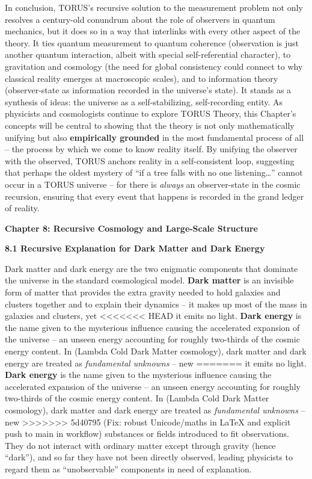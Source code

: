 \documentclass[]{article}
\begin{document}
In conclusion, TORUS's recursive solution to the measurement problem not
only resolves a century-old conundrum about the role of observers in
quantum mechanics, but it does so in a way that interlinks with every
other aspect of the theory. It ties quantum measurement to quantum
coherence (observation is just another quantum interaction, albeit with
special self-referential character), to gravitation and cosmology (the
need for global consistency could connect to why classical reality
emerges at macroscopic scales), and to information theory
(observer-state as information recorded in the universe's state). It
stands as a synthesis of ideas: the universe as a self-stabilizing,
self-recording entity. As physicists and cosmologists continue to
explore TORUS Theory, this Chapter's concepts will be central to showing
that the theory is not only mathematically unifying but also
\textbf{empirically grounded} in the most fundamental process of all --
the process by which we come to know reality itself. By unifying the
observer with the observed, TORUS anchors reality in a self-consistent
loop, suggesting that perhaps the oldest mystery of ``if a tree falls
with no one listening\ldots{}'' cannot occur in a TORUS universe -- for
there is \emph{always} an observer-state in the cosmic recursion,
ensuring that every event that happens is recorded in the grand ledger
of reality.

\textbf{Chapter 8: Recursive Cosmology and Large-Scale Structure}

\textbf{8.1 Recursive Explanation for Dark Matter and Dark Energy}

Dark matter and dark energy are the two enigmatic components that
dominate the universe in the standard cosmological model. \textbf{Dark
matter} is an invisible form of matter that provides the extra gravity
needed to hold galaxies and clusters together and to explain their
dynamics -- it makes up most of the mass in galaxies and clusters, yet
<<<<<<< HEAD
it emits no light\hspace{0pt}. \textbf{Dark energy} is the name given to
the mysterious influence causing the accelerated expansion of the
universe -- an unseen energy accounting for roughly two-thirds of the
cosmic energy content. In \LambdaCDM (Lambda Cold Dark Matter cosmology), dark
matter and dark energy are treated as \emph{fundamental unknowns} -- new
=======
it emits no light​. \textbf{Dark energy} is the name given to the
mysterious influence causing the accelerated expansion of the universe
-- an unseen energy accounting for roughly two-thirds of the cosmic
energy content. In \LambdaCDM (Lambda Cold Dark Matter cosmology), dark matter
and dark energy are treated as \emph{fundamental unknowns} -- new
>>>>>>> 5d40795 (Fix: robust Unicode/maths in LaTeX and explicit push to main in workflow)
substances or fields introduced to fit observations. They do not
interact with ordinary matter except through gravity (hence ``dark''),
and so far they have not been directly observed, leading physicists to
regard them as ``unobservable'' components in need of explanation.
\end{document}
